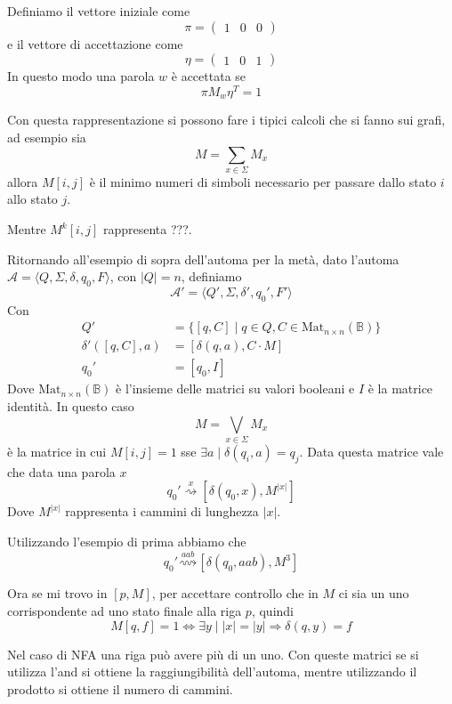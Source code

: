\documentclass[12pt]{article}
\begin{document}
Definiamo il vettore iniziale come
$$ \pi = \begin{pmatrix} 1 & 0 & 0 \end{pmatrix} $$
e il vettore di accettazione come
$$ \eta = \begin{pmatrix} 1 & 0 & 1 \end{pmatrix} $$
In questo modo una parola $w$ è accettata se
$$ \pi M_w \eta^T = 1 $$

Con questa rappresentazione si possono fare i tipici calcoli che si fanno sui grafi, ad esempio sia 
$$ M = \sum_{x \in \Sigma} M_x $$
allora $M[i, j]$ è il minimo numeri di simboli necessario per passare dallo stato $i$ allo stato $j$.	%

Mentre $M^k[i, j]$ rappresenta ???.

Ritornando all'esempio di sopra dell'automa per la metà, dato l'automa $\mathcal{A} = \langle Q, \Sigma, \delta, q_0, F\rangle$, con $|Q| = n$, definiamo
$$ \mathcal{A}' = \langle Q', \Sigma, \delta', q_0', F' \rangle $$
Con
\begin{align*}
	Q' &= \{ [q, C] \mid q \in Q, C \in \text{Mat}_{n \times n}(\mathbb{B}) \}  \\
	\delta'([q, C], a) &= [\delta(q, a), C \cdot M ] \\
	q_0' &= [q_0, I] 
\end{align*}
Dove $\text{Mat}_{n \times n}(\mathbb{B})$ è l'insieme delle matrici su valori booleani e $I$ è la matrice identità.
In questo caso 
$$ M = \bigvee_{x \in \Sigma} M_x $$
è la matrice in cui $M[i, j] = 1$ sse $\exists a \mid \delta(q_i, a) = q_j$.
Data questa matrice vale che data una parola $x$
$$ q_0' \overset{x}{\rightsquigarrow} \left [\delta(q_0, x), M^{|x|} \right ] $$
Dove $M^{|x|}$ rappresenta i cammini di lunghezza $|x|$.

\begin{tcolorbox}
	Utilizzando l'esempio di prima abbiamo che
	$$ q_0' \overset{aab}{\rightsquigarrow} [\delta(q_0, aab), M^3 ] $$
\end{tcolorbox}

Ora se mi trovo in $[p, M]$, per accettare controllo che in $M$ ci sia un uno corrispondente ad uno stato finale alla riga $p$, quindi
$$ M[q, f] = 1 \Leftrightarrow \exists y \mid |x| = |y| \Rightarrow \delta(q, y) = f $$

Nel caso di NFA una riga può avere più di un uno.
Con queste matrici se si utilizza l'and si ottiene la raggiungibilità dell'automa, mentre utilizzando il prodotto si ottiene il numero di cammini.
\end{document}
